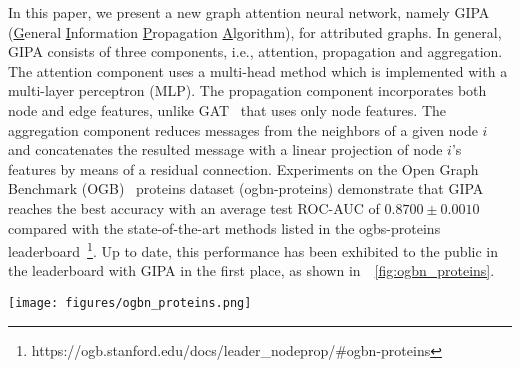 \documentclass[sigconf]{acmart}
\newcommand{\model}{GIPA\xspace}
\begin{document}
In this paper, we present a new graph attention neural network, namely GIPA (\underline{G}eneral \underline{I}nformation \underline{P}ropagation \underline{A}lgorithm), for attributed graphs.
In general, GIPA consists of three components, i.e.,  attention, propagation and aggregation.
The attention component uses a multi-head method which  is implemented with a multi-layer perceptron (MLP). 
The propagation component incorporates both node and edge features, unlike GAT~\cite{velivckovic2017graph} that uses only node features.
The aggregation component reduces messages from the neighbors of a given node $i$ and concatenates the resulted message with a linear projection of node $i$'s features by means of a residual connection.
Experiments on the Open Graph Benchmark (OGB)~\cite{hu2020open} proteins dataset (ogbn-proteins)  demonstrate that GIPA reaches the best accuracy with an average test ROC-AUC of $0.8700\pm 0.0010$ compared with the  state-of-the-art methods listed in the ogbs-proteins leaderboard~\footnote{https://ogb.stanford.edu/docs/leader\_nodeprop/\#ogbn-proteins}.
Up to date, this performance has been exhibited to the public in the leaderboard with \model in the first place, as shown in~\figurename~\ref{fig:ogbn_proteins}.
\begin{figure*}[!h]
    \centering
    \texttt{[image: figures/ogbn\_proteins.png]}
    \caption{A snapshot of the leaderboard of ogbn-proteins with \model as the champion.}
    \label{fig:ogbn_proteins}
\end{figure*} 
\end{document}
